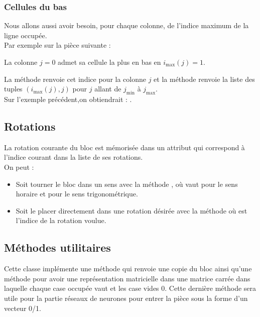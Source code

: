 \subsubsection{Cellules du bas}
Nous allons aussi avoir besoin, pour chaque colonne, de l'indice maximum de la ligne occupée.\\
Par exemple sur la pièce suivante :

La colonne $j=0$ admet sa cellule la plus en bas en $i_\text{max}(j)=1$.

La méthode  renvoie cet indice pour la colonne $j$ et la méthode  renvoie la liste des tuples $(i_\text{max}(j),j)$ pour $j$ allant de $j_\text{min}$ à $j_\text{max}$.\\
Sur l'exemple précédent,on obtiendrait : \pyth{[(0,1), (1,0), (2,0)]}.


\subsection{Rotations}
La rotation courante du bloc est mémorisée dans un attribut  qui correspond à l'indice courant dans la liste de ses rotations.\\
On peut  :
\begin{itemize}
	\item Soit tourner le bloc dans un sens avec la méthode , où  vaut  pour le sens horaire et  pour le sens trigonométrique.
	\item Soit le placer directement dans une rotation désirée avec la méthode  où  est l'indice de la rotation voulue.
\end{itemize}

\subsection{Méthodes utilitaires}
Cette classe implémente une méthode  qui renvoie une copie du bloc ainsi qu'une méthode  pour avoir une représentation matricielle dans une matrice carrée dans laquelle chaque case occupée vaut  et les case vides 0. Cette dernière méthode sera utile pour la partie réseaux de neurones pour entrer la pièce sous la forme d'un vecteur 0/1. 

